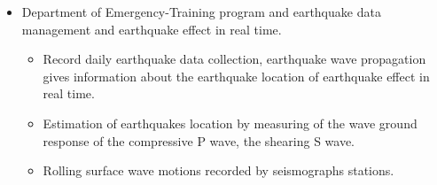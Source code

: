 \documentclass[margin]{res}
\begin{document}
\begin{resume}
\begin{itemize}
\item Department of Emergency-Training program and earthquake data management and earthquake effect in real time.
\begin{itemize}
\item Record daily earthquake data collection, earthquake wave propagation gives information about the earthquake location of earthquake effect in real time.
\item Estimation of earthquakes location by measuring of the wave ground response of the compressive P wave, the shearing S wave.
\item Rolling surface wave motions recorded by seismographs stations.
\end{itemize}
\end{itemize} 

% 

\end{resume}
\end{document}

